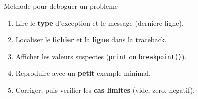 \documentclass[11pt,a4paper]{article}
\begin{document}
\vspace{0.6cm}
\begin{infobox}{Methode pour deboguer un probleme}
\begin{enumerate}[leftmargin=*,itemsep=2pt,topsep=2pt]
  \item Lire le \textbf{type} d'exception et le message (derniere ligne).
  \item Localiser le \textbf{fichier} et la \textbf{ligne} dans la traceback.
  \item Afficher les valeurs suspectes (\texttt{print} ou \texttt{breakpoint()}).
  \item Reproduire avec un \textbf{petit} exemple minimal.
  \item Corriger, puis verifier les \textbf{cas limites} (vide, zero, negatif).
\end{enumerate}
\end{infobox}
\end{document}
